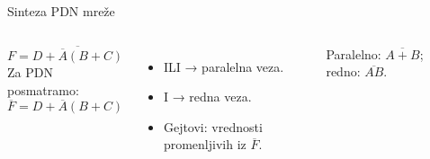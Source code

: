 \begin{frame}[label=09_3-s031]{Sinteza PDN mreže}
\begin{columns}[c,onlytextwidth]
\[F=\overline{D+\overline A(B+C)}\]
Za PDN posmatramo:
\[\overline F=D+\overline A(B+C)\]
\begin{itemize}
\item ILI → paralelna veza.
\item I → redna veza.
\item Gejtovi: vrednosti promenljivih iz $\overline F$.
\end{itemize}
Paralelno: $\overline{A+B}$; redno: $\overline{AB}$.
\begin{center}

\end{center}
\end{columns}
\end{frame}
